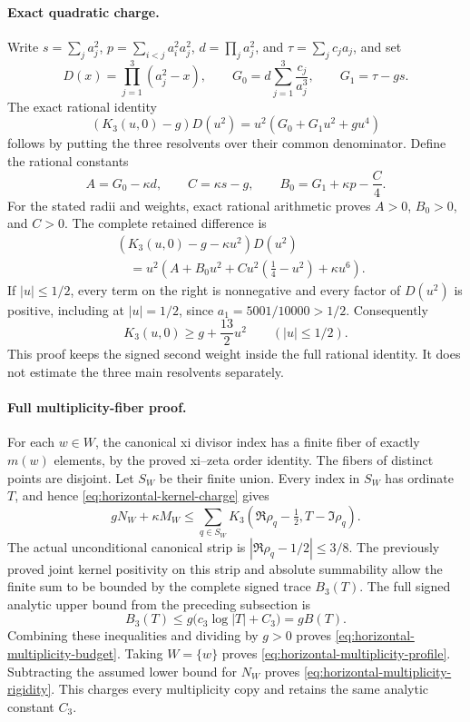 \paragraph{Exact quadratic charge.}
Write \(s=\sum_j a_j^2\), \(p=\sum_{i<j}a_i^2a_j^2\),
\(d=\prod_j a_j^2\), and \(\tau=\sum_jc_ja_j\), and set
\[
 D(x)=\prod_{j=1}^3(a_j^2-x),\qquad
 G_0=d\sum_{j=1}^3\frac{c_j}{a_j^3},\qquad G_1=\tau-gs.
\]
The exact rational identity
\[
 (K_3(u,0)-g)D(u^2)=u^2(G_0+G_1u^2+gu^4)
\]
follows by putting the three resolvents over their common denominator.
Define the rational constants
\[
 A=G_0-\kappa d,\qquad C=\kappa s-g,\qquad
 B_0=G_1+\kappa p-\frac{C}{4}.
\]
For the stated radii and weights, exact rational arithmetic proves
\(A>0\), \(B_0>0\), and \(C>0\).  The complete retained difference is
\begin{align*}
 &(K_3(u,0)-g-\kappa u^2)D(u^2)\\
 &\quad=u^2\left(A+B_0u^2+C u^2(\tfrac14-u^2)+\kappa u^6\right).
\end{align*}
If \(|u|\le1/2\), every term on the right is nonnegative and every
factor of \(D(u^2)\) is positive, including at \(|u|=1/2\), since
\(a_1=5001/10000>1/2\).  Consequently
\begin{equation}
 K_3(u,0)\ge g+\frac{13}{2}u^2\qquad(|u|\le1/2).
 \label{eq:horizontal-kernel-charge}
\end{equation}
This proof keeps the signed second weight inside the full rational
identity.  It does not estimate the three main resolvents separately.

\paragraph{Full multiplicity-fiber proof.}
For each \(w\in W\), the canonical xi divisor index has a finite fiber
of exactly \(m(w)\) elements, by the proved xi--zeta order identity.
The fibers of distinct points are disjoint.  Let \(S_W\) be their finite
union.  Every index in \(S_W\) has ordinate \(T\), and hence
\eqref{eq:horizontal-kernel-charge} gives
\[
 gN_W+\kappa M_W
 \le\sum_{q\in S_W}
 K_3(\Re\rho_q-\tfrac12,T-\Im\rho_q).
\]
The actual unconditional canonical strip is
\(|\Re\rho_q-1/2|\le3/8\).  The previously proved joint kernel
positivity on this strip and absolute summability allow the finite
sum to be bounded by the complete signed trace \(B_3(T)\).  The full
signed analytic upper bound from the preceding subsection is
\[
 B_3(T)\le g\bigl(c_3\log|T|+C_3\bigr)=gB(T).
\]
Combining these inequalities and dividing by \(g>0\) proves
\eqref{eq:horizontal-multiplicity-budget}.  Taking \(W=\{w\}\) proves
\eqref{eq:horizontal-multiplicity-profile}.  Subtracting the assumed
lower bound for \(N_W\) proves
\eqref{eq:horizontal-multiplicity-rigidity}.  This charges every
multiplicity copy and retains the same analytic constant \(C_3\).


